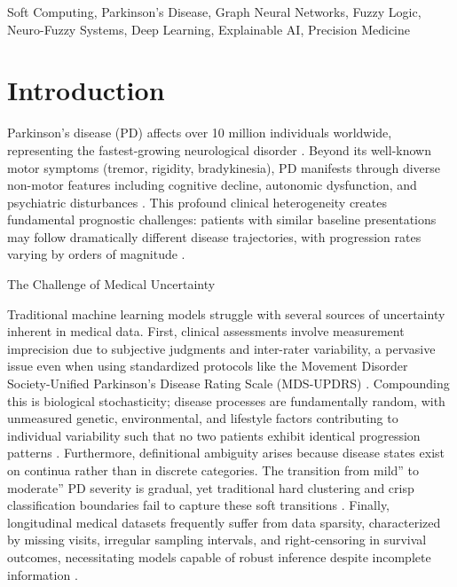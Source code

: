 \documentclass[journal,twoside,web]{ieeecolor}
\begin{document}
\begin{IEEEkeywords}
Soft Computing, Parkinson's Disease, Graph Neural Networks, Fuzzy Logic, Neuro-Fuzzy Systems, Deep Learning, Explainable AI, Precision Medicine
\end{IEEEkeywords}

\section{Introduction}

Parkinson's disease (PD) affects over 10 million individuals worldwide, representing the fastest-growing neurological disorder \cite{dorsey2018parkinsons}. Beyond its well-known motor symptoms (tremor, rigidity, bradykinesia), PD manifests through diverse non-motor features including cognitive decline, autonomic dysfunction, and psychiatric disturbances \cite{schapira2017nonmotor}. This profound clinical heterogeneity creates fundamental prognostic challenges: patients with similar baseline presentations may follow dramatically different disease trajectories, with progression rates varying by orders of magnitude \cite{fereshtehnejad2017clinical}.

The Challenge of Medical Uncertainty

Traditional machine learning models struggle with several sources of uncertainty inherent in medical data. First, clinical assessments involve measurement imprecision due to subjective judgments and inter-rater variability, a pervasive issue even when using standardized protocols like the Movement Disorder Society-Unified Parkinson's Disease Rating Scale (MDS-UPDRS) \cite{goetz2008movement}. Compounding this is biological stochasticity; disease processes are fundamentally random, with unmeasured genetic, environmental, and lifestyle factors contributing to individual variability such that no two patients exhibit identical progression patterns \cite{poewe2017parkinson}. Furthermore, definitional ambiguity arises because disease states exist on continua rather than in discrete categories. The transition from mild'' to moderate'' PD severity is gradual, yet traditional hard clustering and crisp classification boundaries fail to capture these soft transitions \cite{kuncheva2010fuzzy}. Finally, longitudinal medical datasets frequently suffer from data sparsity, characterized by missing visits, irregular sampling intervals, and right-censoring in survival outcomes, necessitating models capable of robust inference despite incomplete information \cite{marek2011ppmi}.
\end{document}
